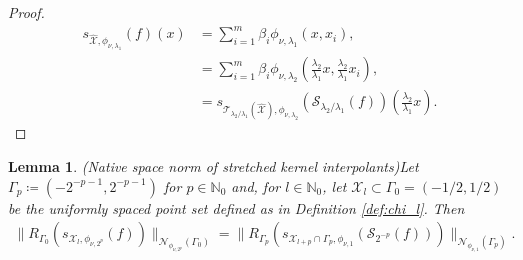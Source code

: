 \documentclass[pdflatex,sn-mathphys-num]{sn-jnl}%
\theoremstyle{thmstyleone}%
\newtheorem{lemma}{Lemma}%
\theoremstyle{thmstyletwo}%
\theoremstyle{thmstylethree}%
\begin{document}
\begin{proof}
    \begin{align}
        s_{\widehat{\mathcal{X}},\phi_{\nu,\lambda_1}}(f)(x)&=\sum_{i=1}^m\beta_i\phi_{\nu,\lambda_1}(x,x_i),\nonumber\\
        &= \sum_{i=1}^m\beta_i\phi_{\nu,\lambda_2}\left(\frac{\lambda_2}{\lambda_1}x,\frac{\lambda_2}{\lambda_1}x_i\right),\nonumber\\
        &= s_{\mathcal{T}_{\lambda_2/\lambda_1}(\widehat{\mathcal{X}}),\phi_{\nu,\lambda_2}}(\mathcal{S}_{\lambda_2/\lambda_1}(f))\left(\frac{\lambda_2}{\lambda_1}x\right).\nonumber
    \end{align}
\end{proof}
\begin{lemma}(Native space norm of stretched kernel interpolants)\label{prop: RKHS stretched kernels}
Let \(\Gamma_{p}\coloneqq(-2^{-p-1},2^{-p-1})\) 
 for \(p\in\mathbb{N}_0\) and, for \(l\in\mathbb{N}_0\), let \(\mathcal{X}_l\subset\Gamma_0=(-1/2,1/2)\) be the uniformly spaced point set defined as in Definition \ref{def:chi_l}. Then
\begin{align}
    \|R_{\Gamma_0}(s_{\mathcal{X}_l,\phi_{\nu,2^p}}(f))\|_{\mathcal{N}_{\phi_{\nu,2^p}}(\Gamma_0)}=\|R_{\Gamma_p}(s_{\mathcal{X}_{l+p}\cap\Gamma_p,\phi_{\nu,1}}(\mathcal{S}_{2^{-p}}(f)))\|_{\mathcal{N}_{\phi_{\nu,1}}(\Gamma_p)}.\nonumber
\end{align}
\end{lemma}
\end{document}
